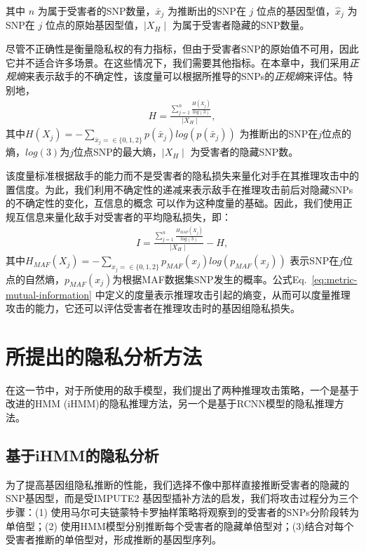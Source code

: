 其中 $n$ 为属于受害者的SNP数量，$\bar{x}_j$ 为推断出的SNP在 $j$ 位点的基因型值，$\hat{x}_j$ 为SNP在 $j$ 位点的原始基因型值，$\mid X_H \mid$ 为属于受害者隐藏的SNP数量。

尽管不正确性是衡量隐私权的有力指标，但由于受害者SNP的原始值不可用，因此它并不适合许多场景。在这些情况下，我们需要其他指标。在本章中，我们采用\textit{正规熵}来表示敌手的不确定性，该度量可以根据所推导的SNPs的\textit{正规熵}来评估。特别地，
\begin{align}\label{eq:metric-entropy}
H = \frac{\sum_{j=1}^n \frac{H(X_j)}{log(3)}}{\mid X_H \mid},
\end{align}
其中$H(X_j)= -\sum_{\bar{x}_j=\in \{0,1,2\}}{p(\bar{x}_j)log(p(\bar{x}_j))}$ 为推断出的SNP在$j$位点的熵，$log(3)$为$j$位点SNP的最大熵，$\mid X_H \mid$ 为受害者的隐藏SNP数。

该度量标准根据敌手的能力而不是受害者的隐私损失来量化对手在其推理攻击中的置信度。为此，我们利用不确定性的递减来表示敌手在推理攻击前后对隐藏SNPs的不确定性的变化，互信息的概念 \cite{peng2016information}可以作为这种度量的基础。因此，我们使用正规互信息来量化敌手对受害者的平均隐私损失，即：
\begin{align}\label{eq:metric-mutual-information}
I = \frac{\sum_{j=1}^n \frac{H_{MAF}(X_j)}{log(3)}}{\mid X_H \mid}
- H,
\end{align}
其中$H_{MAF}(X_j) = -\sum_{x_j=\in \{0,1,2\}}{p_{MAF}(x_j)log(p_{MAF}(x_j))}$ 表示SNP在$j$位点的自然熵，$p_{MAF}(x_j)$为根据MAF数据集SNP发生的概率。公式Eq.~\ref{eq:metric-mutual-information} 中定义的度量表示推理攻击引起的熵变，从而可以度量推理攻击的能力，它还可以评估受害者在推理攻击时的基因组隐私损失。

\section{所提出的隐私分析方法}\label{sec:infer}

在这一节中，对于所使用的敌手模型，我们提出了两种推理攻击策略，一个是基于改进的HMM (iHMM)的隐私推理方法，另一个是基于RCNN模型的隐私推理方法。

\subsection{基于iHMM的隐私分析}

为了提高基因组隐私推断的性能，我们选择不像\cite{samani2015quantifying}中那样直接推断受害者的隐藏的SNP基因型，而是受IMPUTE2 \cite{howie2009flexible}基因型插补方法的启发，我们将攻击过程分为三个步骤：(1) 使用马尔可夫链蒙特卡罗抽样策略将观察到的受害者的SNPs分阶段转为单倍型；(2) 使用HMM模型分别推断每个受害者的隐藏单倍型对；(3)结合对每个受害者推断的单倍型对，形成推断的基因型序列。


